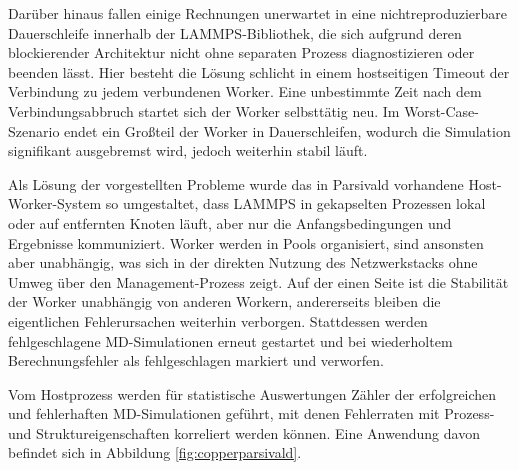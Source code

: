 Darüber hinaus fallen einige Rechnungen unerwartet in eine nichtreproduzierbare Dauerschleife innerhalb der LAMMPS-Bibliothek, die sich aufgrund deren blockierender Architektur nicht ohne separaten Prozess diagnostizieren oder beenden lässt.
Hier besteht die Lösung schlicht in einem hostseitigen Timeout der Verbindung zu jedem verbundenen Worker.
Eine unbestimmte Zeit nach dem Verbindungsabbruch startet sich der Worker selbsttätig neu.
Im Worst-Case-Szenario endet ein Großteil der Worker in Dauerschleifen, wodurch die Simulation signifikant ausgebremst wird, jedoch weiterhin stabil läuft.


Als Lösung der vorgestellten Probleme wurde das in Parsivald vorhandene Host-Worker-System so umgestaltet, dass LAMMPS in gekapselten Prozessen lokal oder auf entfernten Knoten läuft, aber nur die Anfangsbedingungen und Ergebnisse kommuniziert.
Worker werden in Pools organisiert, sind ansonsten aber unabhängig, was sich in der direkten Nutzung des Netzwerkstacks ohne Umweg über den Management-Prozess zeigt.
Auf der einen Seite ist die Stabilität der Worker unabhängig von anderen Workern, andererseits bleiben die eigentlichen Fehlerursachen weiterhin verborgen.
Stattdessen werden fehlgeschlagene MD-Simulationen erneut gestartet und bei wiederholtem Berechnungsfehler als fehlgeschlagen markiert und verworfen.

Vom Hostprozess werden für statistische Auswertungen Zähler der erfolgreichen und fehlerhaften MD-Simulationen geführt, mit denen Fehlerraten mit Prozess- und Struktureigenschaften korreliert werden können.
Eine Anwendung davon befindet sich in Abbildung \ref{fig:copperparsivald}.
